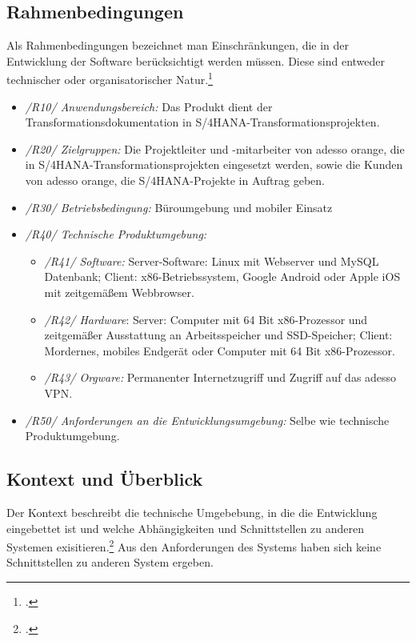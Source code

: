 \subsection{Rahmenbedingungen}
Als Rahmenbedingungen bezeichnet man Einschränkungen, die in der Entwicklung der Software berücksichtigt werden müssen. Diese sind entweder technischer oder organisatorischer Natur.\footcite[Vgl.][S. 459 f.]{balzert}
\begin{itemize}
    \item[] \emph{/R10/ Anwendungsbereich:} Das Produkt dient der Transformationsdokumentation in S/4HANA-Transformationsprojekten.
    \item[] \emph{/R20/ Zielgruppen:} Die Projektleiter und -mitarbeiter von adesso orange, die in S/4HANA-Transformationsprojekten eingesetzt werden, sowie die Kunden von adesso orange, die S/4HANA-Projekte in Auftrag geben.
    \item[] \emph{/R30/ Betriebsbedingung:} Büroumgebung und mobiler Einsatz
    \item[] \emph{/R40/ Technische Produktumgebung:} 
    \begin{itemize}
        \item [] \emph{/R41/ Software:} Server-Software: Linux mit Webserver und MySQL Datenbank; Client: x86-Betriebssystem, Google Android oder Apple iOS mit zeitgemäßem Webbrowser.
        \item [] \emph{/R42/ Hardware}: Server: Computer mit 64 Bit x86-Prozessor und zeitgemäßer Ausstattung an Arbeitsspeicher und SSD-Speicher; Client: Mordernes, mobiles Endgerät oder Computer mit 64 Bit x86-Prozessor.
        \item [] \emph{/R43/ Orgware:} Permanenter Internetzugriff und Zugriff auf das adesso VPN.
    \end{itemize}
    \item[] \emph{/R50/ Anforderungen an die Entwicklungsumgebung:} Selbe wie technische Produktumgebung.
\end{itemize}

\subsection{Kontext und Überblick}
Der Kontext beschreibt die technische Umgebebung, in die die Entwicklung eingebettet ist und welche Abhängigkeiten und Schnittstellen zu anderen Systemen exisitieren.\footcite[Vgl.][S. 461 f.]{balzert} Aus den Anforderungen des Systems haben sich keine Schnittstellen zu anderen System ergeben. 

